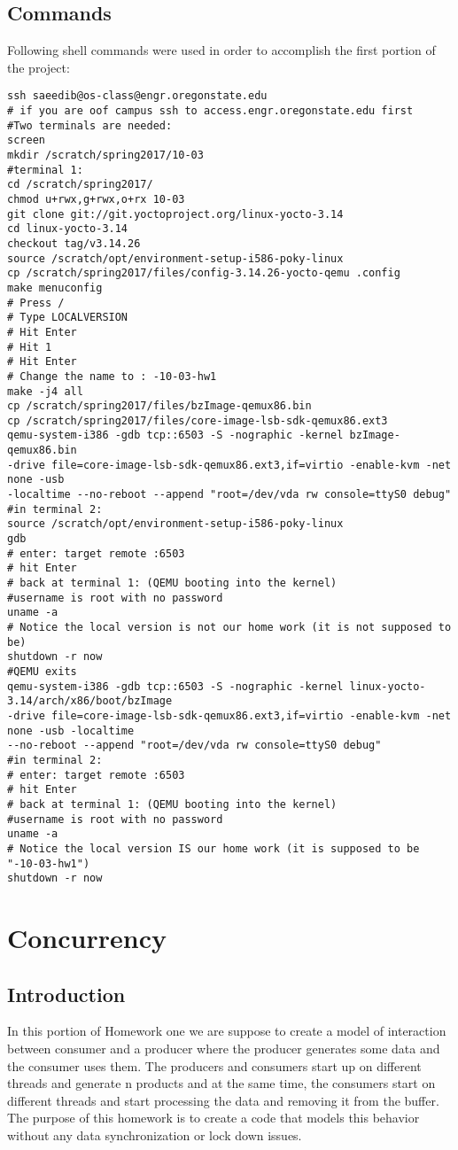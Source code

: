 \documentclass[journal,10pt,onecolumn,compsoc,letterpaper,draftclsnofoot,table,xcdraw]{IEEEtran} \usepackage[margin=0.75in]{geometry}
\begin{document}
\subsection{Commands}
\noindent Following shell commands were used in order to accomplish the first portion of the project:
\begin{verbatim}
ssh saeedib@os-class@engr.oregonstate.edu
# if you are oof campus ssh to access.engr.oregonstate.edu first
#Two terminals are needed:
screen
mkdir /scratch/spring2017/10-03
#terminal 1:
cd /scratch/spring2017/
chmod u+rwx,g+rwx,o+rx 10-03
git clone git://git.yoctoproject.org/linux-yocto-3.14
cd linux-yocto-3.14
checkout tag/v3.14.26
source /scratch/opt/environment-setup-i586-poky-linux
cp /scratch/spring2017/files/config-3.14.26-yocto-qemu .config
make menuconfig
# Press /
# Type LOCALVERSION
# Hit Enter
# Hit 1
# Hit Enter
# Change the name to : -10-03-hw1
make -j4 all
cp /scratch/spring2017/files/bzImage-qemux86.bin
cp /scratch/spring2017/files/core-image-lsb-sdk-qemux86.ext3
qemu-system-i386 -gdb tcp::6503 -S -nographic -kernel bzImage-qemux86.bin
-drive file=core-image-lsb-sdk-qemux86.ext3,if=virtio -enable-kvm -net none -usb 
-localtime --no-reboot --append "root=/dev/vda rw console=ttyS0 debug"
#in terminal 2:
source /scratch/opt/environment-setup-i586-poky-linux
gdb
# enter: target remote :6503
# hit Enter
# back at terminal 1: (QEMU booting into the kernel)
#username is root with no password
uname -a
# Notice the local version is not our home work (it is not supposed to be)
shutdown -r now
#QEMU exits
qemu-system-i386 -gdb tcp::6503 -S -nographic -kernel linux-yocto-3.14/arch/x86/boot/bzImage
-drive file=core-image-lsb-sdk-qemux86.ext3,if=virtio -enable-kvm -net none -usb -localtime
--no-reboot --append "root=/dev/vda rw console=ttyS0 debug"
#in terminal 2:
# enter: target remote :6503
# hit Enter
# back at terminal 1: (QEMU booting into the kernel)
#username is root with no password
uname -a
# Notice the local version IS our home work (it is supposed to be "-10-03-hw1")
shutdown -r now
\end{verbatim}
\section{Concurrency}
\subsection{Introduction}
\noindent In this portion of Homework one we are suppose to create a model of interaction between consumer and a producer where the producer generates some data and the consumer uses them. The producers and consumers start up on different threads and generate n products and at the same time, the consumers start on different threads and start processing the data and removing it from the buffer. The purpose of this homework is to create a code that models this behavior without any data synchronization or lock down issues.
\end{document}
